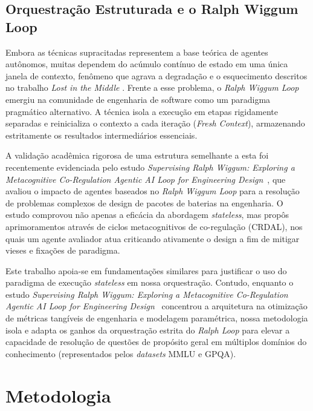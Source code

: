\documentclass[a4paper,10pt,twocolumn]{article}
\begin{document}
\subsection{Orquestração Estruturada e o Ralph Wiggum Loop}

Embora as técnicas supracitadas representem a base teórica de agentes autônomos, muitas dependem do acúmulo contínuo de estado em uma única janela de contexto, fenômeno que agrava a degradação e o esquecimento descritos no trabalho \textit{Lost in the Middle} \cite{liu2023lost}. Frente a esse problema, o \textit{Ralph Wiggum Loop} \cite{ghuntley2025ralph} emergiu na comunidade de engenharia de software como um paradigma pragmático alternativo. A técnica isola a execução em etapas rigidamente separadas e reinicializa o contexto a cada iteração (\textit{Fresh Context}), armazenando estritamente os resultados intermediários essenciais.

A validação acadêmica rigorosa de uma estrutura semelhante a esta foi recentemente evidenciada pelo estudo \textit{Supervising Ralph Wiggum: Exploring a Metacognitive Co-Regulation Agentic AI Loop for Engineering Design}~\cite{supervising_ralph_wiggum_2026}, que avaliou o impacto de agentes baseados no \textit{Ralph Wiggum Loop} para a resolução de problemas complexos de design de pacotes de baterias na engenharia. O estudo comprovou não apenas a eficácia da abordagem \textit{stateless}, mas propôs aprimoramentos através de ciclos metacognitivos de co-regulação (CRDAL), nos quais um agente avaliador atua criticando ativamente o design a fim de mitigar vieses e fixações de paradigma.

Este trabalho apoia-se em fundamentações similares para justificar o uso do paradigma de execução \textit{stateless} em nossa orquestração. Contudo, enquanto o estudo \textit{Supervising Ralph Wiggum: Exploring a Metacognitive Co-Regulation Agentic AI Loop for Engineering Design}~\cite{supervising_ralph_wiggum_2026} concentrou a arquitetura na otimização de métricas tangíveis de engenharia e modelagem paramétrica, nossa metodologia isola e adapta os ganhos da orquestração estrita do \textit{Ralph Loop} para elevar a capacidade de resolução de questões de propósito geral em múltiplos domínios do conhecimento (representados pelos \textit{datasets} MMLU e GPQA).

\section{Metodologia}
\end{document}
